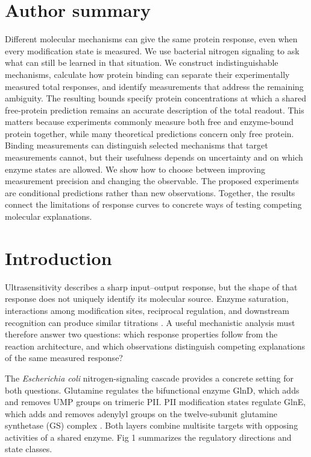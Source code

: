 \documentclass[10pt,letterpaper]{article}
\begin{document}
\section*{Author summary}

Different molecular mechanisms can give the same protein response, even when every modification state is measured. We use bacterial nitrogen signaling to ask what can still be learned in that situation. We construct indistinguishable mechanisms, calculate how protein binding can separate their experimentally measured total responses, and identify measurements that address the remaining ambiguity. The resulting bounds specify protein concentrations at which a shared free-protein prediction remains an accurate description of the total readout. This matters because experiments commonly measure both free and enzyme-bound protein together, while many theoretical predictions concern only free protein. Binding measurements can distinguish selected mechanisms that target measurements cannot, but their usefulness depends on uncertainty and on which enzyme states are allowed. We show how to choose between improving measurement precision and changing the observable. The proposed experiments are conditional predictions rather than new observations. Together, the results connect the limitations of response curves to concrete ways of testing competing molecular explanations.

\clearpage
{}

\section*{Introduction}

Ultrasensitivity describes a sharp input--output response, but the shape of that response does not uniquely identify its molecular source. Enzyme saturation, interactions among modification sites, reciprocal regulation, and downstream recognition can produce similar titrations \cite{r1,r2}. A useful mechanistic analysis must therefore answer two questions: which response properties follow from the reaction architecture, and which observations distinguish competing explanations of the same measured response?

The \textit{Escherichia coli} nitrogen-signaling cascade provides a concrete setting for both questions. Glutamine regulates the bifunctional enzyme GlnD, which adds and removes UMP groups on trimeric PII. PII modification states regulate GlnE, which adds and removes adenylyl groups on the twelve-subunit glutamine synthetase (GS) complex \cite{r5,r6,r7}. Both layers combine multisite targets with opposing activities of a shared enzyme. Fig 1 summarizes the regulatory directions and state classes.
\end{document}
